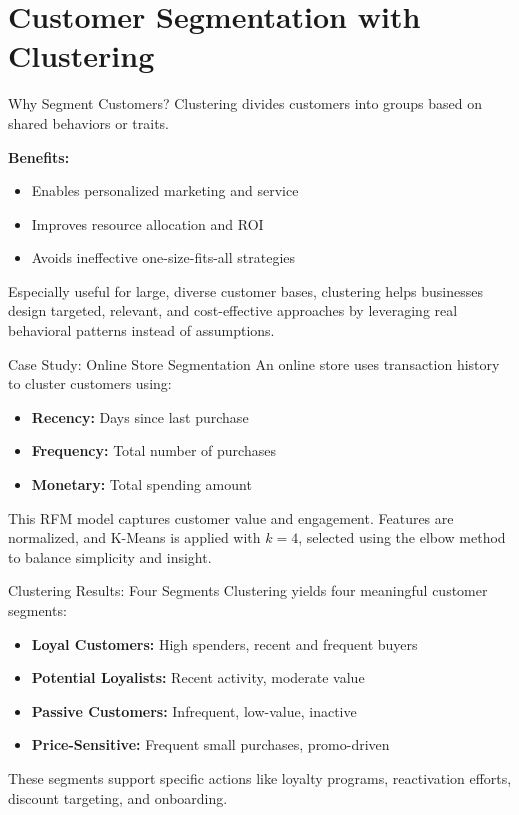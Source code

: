 \documentclass[aspectratio=169, table]{beamer}
\begin{document}
\section{Customer Segmentation with Clustering}

\begin{frame}{Why Segment Customers?}
	Clustering divides customers into groups based on shared behaviors or traits. 
	
	\textbf{Benefits:}
	\begin{itemize}
		\item Enables personalized marketing and service
		\item Improves resource allocation and ROI
		\item Avoids ineffective one-size-fits-all strategies
	\end{itemize}
	
	Especially useful for large, diverse customer bases, clustering helps businesses design targeted, relevant, and cost-effective approaches by leveraging real behavioral patterns instead of assumptions.
\end{frame}

\begin{frame}{Case Study: Online Store Segmentation}
	An online store uses transaction history to cluster customers using:
	
	\begin{itemize}
		\item \textbf{Recency:} Days since last purchase
		\item \textbf{Frequency:} Total number of purchases
		\item \textbf{Monetary:} Total spending amount
	\end{itemize}
	
	This RFM model captures customer value and engagement. Features are normalized, and K-Means is applied with \(k = 4\), selected using the elbow method to balance simplicity and insight.
\end{frame}

\begin{frame}{Clustering Results: Four Segments}
	Clustering yields four meaningful customer segments:
	
	\begin{itemize}
		\item \textbf{Loyal Customers:} High spenders, recent and frequent buyers
		\item \textbf{Potential Loyalists:} Recent activity, moderate value
		\item \textbf{Passive Customers:} Infrequent, low-value, inactive
		\item \textbf{Price-Sensitive:} Frequent small purchases, promo-driven
	\end{itemize}
	
	These segments support specific actions like loyalty programs, reactivation efforts, discount targeting, and onboarding.
\end{frame}
\end{document}
